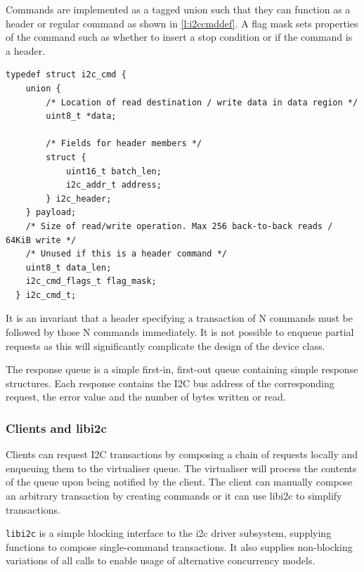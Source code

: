 \documentclass[a4paper,12pt]{report}
\begin{document}
Commands are implemented as a tagged union such that they can function as a header or
regular command as shown in \autoref{l:i2ccmddef}. A flag mask sets properties of
the command such as whether to insert a stop condition or if the command is a header.

\begin{lstlisting}[gobble=2,firstline=2,float=th,
  label={l:i2ccmddef},
  caption={I2C command structure.}]
  typedef struct i2c_cmd {
    union {
        /* Location of read destination / write data in data region */
        uint8_t *data;

        /* Fields for header members */
        struct {
            uint16_t batch_len;
            i2c_addr_t address;
        } i2c_header;
    } payload;
    /* Size of read/write operation. Max 256 back-to-back reads / 64KiB write */
    /* Unused if this is a header command */
    uint8_t data_len;
    i2c_cmd_flags_t flag_mask;
  } i2c_cmd_t;
\end{lstlisting}

It is an invariant that a header specifying a transaction of N commands must be followed
by those N commands immediately. It is not possible to enqueue partial requests as this
will significantly complicate the design of the device class.

The response queue is a simple first-in, first-out queue containing simple response
structures. Each response contains the I2C bus address of the corresponding request,
the error value and the number of bytes written or read.


\subsubsection{Clients and libi2c}

Clients can request I2C transactions by composing a chain of requests locally and enqueuing
them to the virtualiser queue. The virtualiser will process the contents of the queue upon
being notified by the client. The client can manually compose an arbitrary transaction by
creating commands or it can use libi2c to simplify transactions.

\texttt{libi2c} is a simple blocking interface to the \gls{i2c} driver subsystem, supplying
functions to compose single-command transactions. It also supplies non-blocking variations of
all calls to enable usage of alternative concurrency models.
\end{document}
